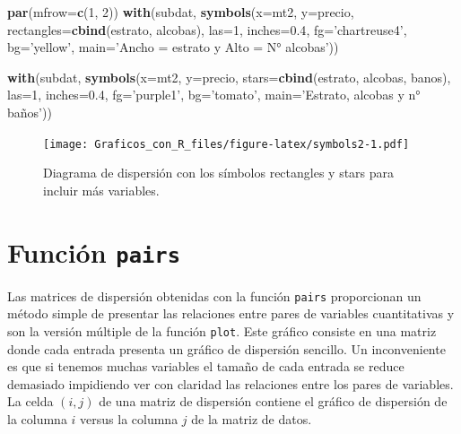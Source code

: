 \documentclass[10pt,]{krantz}
\makeatletter
\newenvironment{Shaded}{\begin{snugshade}}{\end{snugshade}}
\newcommand{\KeywordTok}[1]{\textcolor[rgb]{0.13,0.29,0.53}{\textbf{#1}}}
\newcommand{\DataTypeTok}[1]{\textcolor[rgb]{0.13,0.29,0.53}{#1}}
\newcommand{\DecValTok}[1]{\textcolor[rgb]{0.00,0.00,0.81}{#1}}
\newcommand{\FloatTok}[1]{\textcolor[rgb]{0.00,0.00,0.81}{#1}}
\newcommand{\StringTok}[1]{\textcolor[rgb]{0.31,0.60,0.02}{#1}}
\newcommand{\NormalTok}[1]{#1}
\newenvironment{kframe}{%
\medskip{}
\setlength{\fboxsep}{.8em}
 \def\at@end@of@kframe{}%
 \ifinner\ifhmode%
  \def\at@end@of@kframe{\end{minipage}}%
  \begin{minipage}{\columnwidth}%
 \fi\fi%
 \def\FrameCommand##1{\hskip\@totalleftmargin \hskip-\fboxsep
 \colorbox{shadecolor}{##1}\hskip-\fboxsep
     \hskip-\linewidth \hskip-\@totalleftmargin \hskip\columnwidth}%
 \MakeFramed {\advance\hsize-\width
   \@totalleftmargin\z@ \linewidth\hsize
   \@setminipage}}%
 {\par\unskip\endMakeFramed%
 \at@end@of@kframe}
\renewenvironment{Shaded}{\begin{kframe}}{\end{kframe}}
\makeatother
\begin{document}
\begin{Shaded}
\begin{Highlighting}[]
\KeywordTok{par}\NormalTok{(}\DataTypeTok{mfrow=}\KeywordTok{c}\NormalTok{(}\DecValTok{1}\NormalTok{, }\DecValTok{2}\NormalTok{))}
\KeywordTok{with}\NormalTok{(subdat, }\KeywordTok{symbols}\NormalTok{(}\DataTypeTok{x=}\NormalTok{mt2, }\DataTypeTok{y=}\NormalTok{precio,}
                     \DataTypeTok{rectangles=}\KeywordTok{cbind}\NormalTok{(estrato, alcobas), }
                     \DataTypeTok{las=}\DecValTok{1}\NormalTok{, }\DataTypeTok{inches=}\FloatTok{0.4}\NormalTok{, }
                     \DataTypeTok{fg=}\StringTok{'chartreuse4'}\NormalTok{, }\DataTypeTok{bg=}\StringTok{'yellow'}\NormalTok{,}
                     \DataTypeTok{main=}\StringTok{'Ancho = estrato y Alto = N° alcobas'}\NormalTok{))}

\KeywordTok{with}\NormalTok{(subdat, }\KeywordTok{symbols}\NormalTok{(}\DataTypeTok{x=}\NormalTok{mt2, }\DataTypeTok{y=}\NormalTok{precio,}
                     \DataTypeTok{stars=}\KeywordTok{cbind}\NormalTok{(estrato, alcobas,}
\NormalTok{                                 banos), }
                     \DataTypeTok{las=}\DecValTok{1}\NormalTok{, }\DataTypeTok{inches=}\FloatTok{0.4}\NormalTok{, }
                     \DataTypeTok{fg=}\StringTok{'purple1'}\NormalTok{, }\DataTypeTok{bg=}\StringTok{'tomato'}\NormalTok{,}
                     \DataTypeTok{main=}\StringTok{'Estrato, alcobas y n° baños'}\NormalTok{))}
\end{Highlighting}
\end{Shaded}

\begin{figure}
\centering
\texttt{[image: Graficos\_con\_R\_files/figure-latex/symbols2-1.pdf]}
\caption{\label{fig:symbols2}Diagrama de dispersión con los símbolos
rectangles y stars para incluir más variables.}
\end{figure}

\section{\texorpdfstring{Función \texttt{pairs}
}{Función pairs }}\label{funcion-pairs}

Las matrices de dispersión obtenidas con la función \texttt{pairs}
proporcionan un método simple de presentar las relaciones entre pares de
variables cuantitativas y son la versión múltiple de la función
\texttt{plot}. Este gráfico consiste en una matriz donde cada entrada
presenta un gráfico de dispersión sencillo. Un inconveniente es que si
tenemos muchas variables el tamaño de cada entrada se reduce demasiado
impidiendo ver con claridad las relaciones entre los pares de variables.
La celda \((i,j)\) de una matriz de dispersión contiene el gráfico de
dispersión de la columna \(i\) versus la columna \(j\) de la matriz de
datos.
\end{document}
